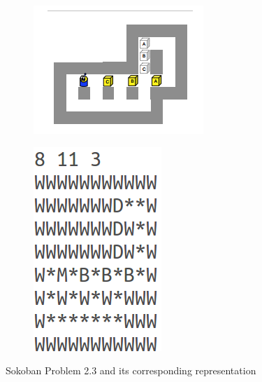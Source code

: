 \documentclass[10pt, letter]{article}
\begin{document}
\begin{figure} [h!]
\centering
\begin{subfigure}{.5\textwidth}
  \centering
  \includegraphics[scale = 0.5]{images/sokoban3}
\end{subfigure}%
\begin{subfigure}{.5\textwidth}
  \centering
  \includegraphics[scale = 0.5]{images/sokoban3-plan}
\end{subfigure}%
\caption{Sokoban Problem 2.3 and its corresponding representation}
\label{soko3}
\end{figure}
\end{document}
